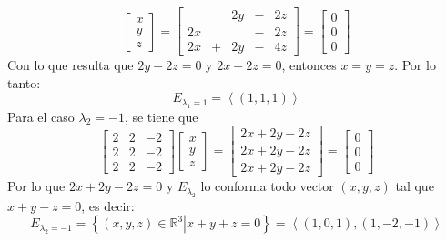 \begin{solucion}
\begin{enumerate}[$a$)]
\begin{equation*}
   \begin{bmatrix}
    x \\ y \\ z
   \end{bmatrix}
   =
   \begin{bmatrix}
    & & 2y & - & 2z \\
    2x & & & - & 2z \\
    2x & + & 2y & - & 4z
   \end{bmatrix}
   =
   \begin{bmatrix}
    0 \\ 0 \\ 0
   \end{bmatrix}
  \end{equation*}
  Con lo que resulta que $2y - 2z = 0$ y $2x - 2z = 0$, entonces $x = y = z$. Por lo tanto:
  \begin{equation*}
   E_{\lambda_1 = 1} = \left< (1,1,1) \right>
  \end{equation*}
  Para el caso $\lambda_2 = -1$, se tiene que
  \begin{equation*}
   \begin{bmatrix}
    2 & 2 & -2 \\ 
    2 & 2 & -2 \\
    2 & 2 & -2
   \end{bmatrix}
   \begin{bmatrix}
    x \\ y \\ z
   \end{bmatrix}
   = 
   \begin{bmatrix}
    2x + 2y - 2z \\
    2x + 2y - 2z \\
    2x + 2y - 2z    
   \end{bmatrix}
   =
   \begin{bmatrix}
    0 \\ 0 \\ 0
   \end{bmatrix}
  \end{equation*}
  Por lo que $2x + 2y - 2z = 0$ y $E_{\lambda_2}$ lo conforma todo vector $(x,y,z)$ tal que $x+y-z=0$, es decir:
  \begin{equation*}
   E_{\lambda_2 = -1} = \left\{ \left. (x,y,z) \in \mathbb{R}^3 \right| x+y+z = 0 \right\} = \left< (1,0,1), (1,-2,-1) \right>
  \end{equation*}
  

\end{enumerate}
\end{solucion}
